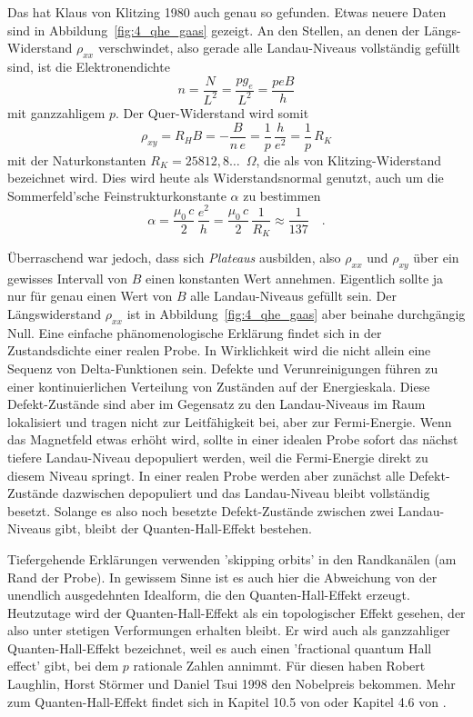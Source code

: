 Das hat Klaus von Klitzing 1980 auch genau  so gefunden. Etwas neuere Daten sind in Abbildung~\ref{fig:4_qhe_gaas} gezeigt. An den Stellen, an denen der Längs-Widerstand $\rho_{xx}$ verschwindet, also gerade alle Landau-Niveaus vollständig gefüllt sind, ist die Elektronendichte
\begin{equation}
   n = \frac{N}{L^2} = \frac{p g_e}{L^2} = \frac{p e B}{h}
\end{equation}
mit ganzzahligem $p$. Der Quer-Widerstand wird somit
\begin{equation}
  \rho_{xy} = R_H B =  - \frac{B}{n \, e} = \frac{1}{p} \, \frac{h}{e^2} = \frac{1}{p} \, R_K
\end{equation} 
mit der Naturkonstanten $R_K = 25812,8\dots$~$\Omega$, die als von Klitzing-Widerstand bezeichnet wird. Dies wird heute als Widerstandsnormal genutzt,  auch um die Sommerfeld'sche Feinstrukturkonstante $\alpha$ zu bestimmen
\begin{equation}
   \alpha = \frac{\mu_0 \, c}{2} \, \frac{e^2}{h} = \frac{\mu_0 \, c}{2} \, \frac{1}{R_K} \approx \frac{1}{137} \quad .
\end{equation}



Überraschend war jedoch, dass sich \emph{Plateaus} ausbilden, also  $\rho_{xx}$  und $\rho_{xy}$ über ein gewisses Intervall von $B$ einen konstanten Wert annehmen. Eigentlich sollte ja nur für genau einen Wert von  $B$ alle Landau-Niveaus gefüllt sein. Der Längswiderstand $\rho_{xx}$ ist in Abbildung~\ref{fig:4_qhe_gaas} aber beinahe durchgängig Null.  Eine einfache phänomenologische Erklärung findet sich in der Zustandsdichte einer realen Probe. In Wirklichkeit wird die nicht allein eine Sequenz von Delta-Funktionen sein. Defekte und Verunreinigungen führen zu einer kontinuierlichen Verteilung von Zuständen auf der Energieskala. Diese Defekt-Zustände sind aber im Gegensatz zu den Landau-Niveaus im Raum lokalisiert und tragen nicht zur Leitfähigkeit bei, aber zur Fermi-Energie. Wenn das Magnetfeld  etwas erhöht wird, sollte in einer idealen Probe sofort das nächst tiefere  Landau-Niveau depopuliert werden, weil die Fermi-Energie direkt zu diesem Niveau springt. In einer realen Probe werden aber zunächst alle Defekt-Zustände dazwischen depopuliert und das Landau-Niveau bleibt vollständig besetzt. Solange es also noch besetzte Defekt-Zustände zwischen zwei Landau-Niveaus gibt, bleibt der Quanten-Hall-Effekt bestehen.

Tiefergehende Erklärungen verwenden 'skipping orbits' in den Randkanälen (am Rand der Probe). In gewissem Sinne ist es auch hier die Abweichung von der unendlich ausgedehnten Idealform, die den Quanten-Hall-Effekt erzeugt.
Heutzutage wird der Quanten-Hall-Effekt als ein topologischer Effekt gesehen, der also unter stetigen Verformungen erhalten  bleibt. Er wird auch als ganzzahliger Quanten-Hall-Effekt bezeichnet, weil es auch einen 'fractional quantum Hall effect' gibt, bei dem $p$ rationale Zahlen annimmt. Für diesen haben Robert Laughlin, Horst Störmer und Daniel Tsui 1998 den Nobelpreis bekommen. Mehr zum Quanten-Hall-Effekt findet sich in Kapitel 10.5 von \cite{Gross_FK} oder Kapitel 4.6 von \cite{Czycholl_theo_FK2}.


